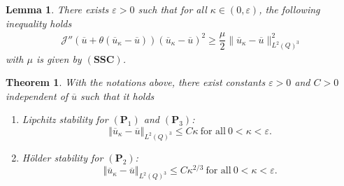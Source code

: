 \documentclass[10pt,a4paper]{amsart}
\newtheorem{theorem}{Theorem}
\newtheorem{lemma}{Lemma}
\begin{document}
	\begin{lemma}\label{lem6.3}
		There exists $\varepsilon >0$ such that for all $\kappa \in (0,\varepsilon)$, the following inequality holds
		\begin{align}\label{6.25}
			\mathcal{J}''(\overline{u} + \theta (\overline{u}_\kappa - \overline{u} ))( \overline{u}_\kappa - \overline{u})^2 \geq \dfrac{\mu}{2}\| \overline{u}_\kappa - \overline{u} \|^2_{L^2(Q)^3}
		\end{align}
		with $\mu$ is given by $(\textbf{SSC})$. 
	\end{lemma}

	\begin{theorem}\label{theo6.3}
		With the notations above, there exist constants $\varepsilon>0$ and $C>0$ independent of $\overline{u}$ such that it holds
		\begin{enumerate}
			\item Lipchitz stability for $(\textbf{P}_1)$ and $(\textbf{P}_3)$: 
			\begin{equation} \label{lipz_sta_j13}
				\left\Vert \overline{u}_\kappa - \overline{u} \right\Vert_{L^2(Q)^3} \leq C \kappa \ \text{for all} \ 0<\kappa <\varepsilon.
			\end{equation}
			\item H\"older stability for $(\textbf{P}_2)$: 
			\begin{equation} \label{lipz_sta_j2}
				\left\Vert \overline{u}_\kappa - \overline{u} \right\Vert_{L^2(Q)^3} \leq C \kappa^{2/3} \ \text{for all} \ 0<\kappa <\varepsilon.
			\end{equation}
		\end{enumerate}
	\end{theorem}
\end{document}
